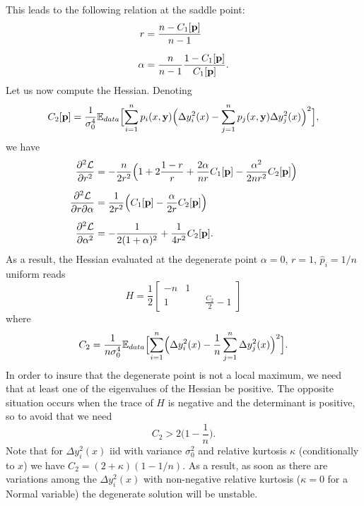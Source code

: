 \documentclass[envcountsect,runningheads]{llncs}
\theoremstyle{etoile}
\def\DD{\displaystyle}
\begin{document}
This leads to the following relation at the saddle point:
\begin{align*}
  r &= \frac{n-C_1[{\bf p}]}{n-1}\\[0.2cm]
\alpha &= \frac{n}{n-1}\frac{1-C_1[{\bf p}]}{C_1[{\bf p}]}.
\end{align*}
Let us now compute the Hessian. Denoting
\[
C_2[{\bf p}] = \frac{1}{\sigma_0^4}{\mathbb E}_{data}\Bigl[\sum_{i=1}^n p_i(x,{\bf y})\Bigl(\Delta y_i^2(x)-\sum_{j=1}^np_j(x,{\bf y})\Delta y_j^2(x)\Bigr)^2\Bigr],
\]
we have
\begin{align*}
\frac{\partial^2 {\cal L}}{\partial r^2} &= -\frac{n}{2r^2}\Bigl(1+2\frac{1-r}{r}+\frac{2\alpha}{nr}C_1[{\bf p}]-\frac{\alpha^2}{2nr^2}C_2[{\bf p}]\Bigr)\\[0.2cm]
\frac{\partial^2 {\cal L}}{\partial r\partial \alpha} &=\frac{1}{2r^2}\Bigl(C_1[{\bf p}]-\frac{\alpha}{2r}C_2[{\bf p}]\Bigr)\\[0.2cm]
\frac{\partial^2 {\cal L}}{\partial \alpha^2} &= -\frac{1}{2(1+\alpha)^2}+\frac{1}{4r^2}C_2[{\bf p}]. 
\end{align*}
As a result, the Hessian evaluated at the degenerate point $\alpha=0$, $r=1$, $\hat  p_i=1/n$ uniform reads
\[
H =\frac{1}{2}
\left[
  \begin{matrix}
 -n & 1\\[0.4cm] 
 1 & \qquad\DD \frac{C_2}{2}-1
  \end{matrix}
  \right]
\]
where
\[
C_2 = \frac{1}{n\sigma_0^4}{\mathbb E}_{data}\Bigl[\sum_{i=1}^n \Bigl(\Delta y_i^2(x)-\frac{1}{n}\sum_{j=1}^n\Delta y_j^2(x)\Bigr)^2\Bigr].
\]
In order to insure that the degenerate point is not a local maximum, we need that at least one of the eigenvalues of the Hessian be positive.
The opposite situation occurs when the trace of $H$ is negative and the determinant is positive, so to avoid that we need
\[
C_2 > 2\bigl(1-\frac{1}{n}\bigr).
\]
Note that for $\Delta y_i^2(x)$ iid with variance $\sigma_0^2$ and relative kurtosis $\kappa$ (conditionally to $x$)
we have $C_2 = (2+\kappa)(1-1/n)$.
As a result, as soon as there are variations among the $\Delta y_i^2(x)$ with non-negative relative kurtosis ($\kappa=0$ for a Normal variable)
the  degenerate solution will be unstable.
\end{document}
